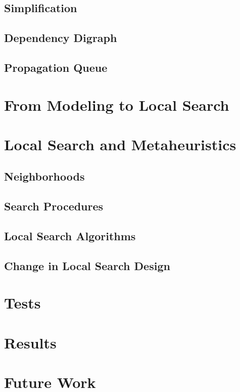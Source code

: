 \documentclass[a4paper,11pt]{article}
\begin{document}
  \subsection{Simplification}
  
  \subsection{Dependency Digraph}
     \label{sec_ddg}
  \subsection{Propagation Queue}  
    \label{sec_propaqueue}
    
  
\newpage  
\section{From Modeling to Local Search}

\newpage
\section{Local Search and Metaheuristics} \label{sec_local}
  
  \subsection{Neighborhoods}
  
  \subsection{Search Procedures}
  
  \subsection{Local Search Algorithms}
  
  \subsection{Change in Local Search Design}
  
  \newpage
\section{Tests}

%
\newpage
\section{Results}
\section{Future Work}
  
\end{document}
